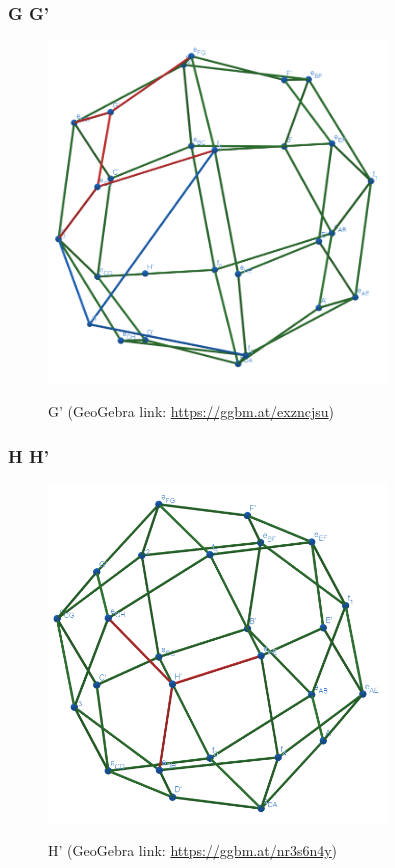 \documentclass{article}
\begin{document}
\subsubsection{G \rightarrow G'}
\begin{figure}[H]
\caption{G' (GeoGebra link: \href{https://ggbm.at/exzncjsu}{https://ggbm.at/exzncjsu})}
\centering
\includegraphics[width=0.8\textwidth]{images/cl-07-7.png}
\label{fig:cube7-7}
\end{figure}
\subsubsection{H \rightarrow H'}
\begin{figure}[H]
\caption{H' (GeoGebra link: \href{https://ggbm.at/nr3s6n4y}{https://ggbm.at/nr3s6n4y})}
\centering
\includegraphics[width=0.8\textwidth]{images/cl-07-8.png}
\label{fig:cube7-8}
\end{figure}
\end{document}
